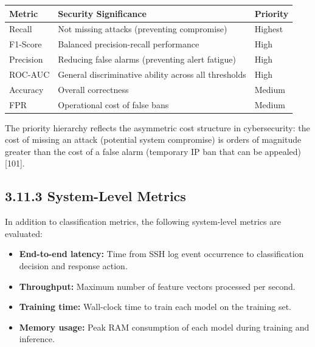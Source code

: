 \documentclass[
  a4paper]{report}
\newcounter{none} %
\providecommand{\tightlist}{%
  \setlength{\itemsep}{0pt}\setlength{\parskip}{0pt}}
\begin{document}
{\def\LTcaptype{none} %
\begin{longtable}[]{@{}
  >{\raggedright\arraybackslash}p{}
  >{\raggedright\arraybackslash}p{}
  >{\raggedright\arraybackslash}p{}@{}}
\toprule\noalign{}
\begin{minipage}[b]{\linewidth}\raggedright
Metric
\end{minipage} & \begin{minipage}[b]{\linewidth}\raggedright
Security Significance
\end{minipage} & \begin{minipage}[b]{\linewidth}\raggedright
Priority
\end{minipage} \\
\midrule\noalign{}
\endhead
\bottomrule\noalign{}
\endlastfoot
Recall & Not missing attacks (preventing compromise) & Highest \\
F1-Score & Balanced precision-recall performance & High \\
Precision & Reducing false alarms (preventing alert fatigue) & High \\
ROC-AUC & General discriminative ability across all thresholds & High \\
Accuracy & Overall correctness & Medium \\
FPR & Operational cost of false bans & Medium \\
\end{longtable}
}

The priority hierarchy reflects the asymmetric cost structure in
cybersecurity: the cost of missing an attack (potential system
compromise) is orders of magnitude greater than the cost of a false
alarm (temporary IP ban that can be appealed) {[}101{]}.

\subsection{3.11.3 System-Level Metrics}\label{system-level-metrics}

In addition to classification metrics, the following system-level
metrics are evaluated:

\begin{itemize}
\tightlist
\item
  \textbf{End-to-end latency:} Time from SSH log event occurrence to
  classification decision and response action.
\item
  \textbf{Throughput:} Maximum number of feature vectors processed per
  second.
\item
  \textbf{Training time:} Wall-clock time to train each model on the
  training set.
\item
  \textbf{Memory usage:} Peak RAM consumption of each model during
  training and inference.
\end{itemize}
\end{document}
